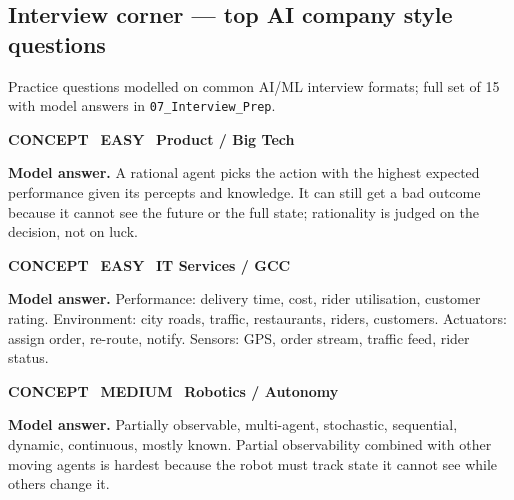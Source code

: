 \subsection*{Interview corner --- top AI company style questions}
{\small\color{slate}Practice questions modelled on common AI/ML interview formats; full set of 15 with model answers in \texttt{07\_Interview\_Prep}.}
\begin{tcolorbox}[enhanced,breakable,colback=white,colframe=teal,arc=2mm,boxrule=0.8pt,left=3mm,right=3mm,
 title={\textbf{QI.01}\quad What is a rational agent, and why is rational not the same as perfect?},fonttitle=\color{white}\small,colbacktitle=teal]
\colorbox{teal!15}{\scriptsize\bfseries\color{teal} CONCEPT}\
\colorbox{leaf!15}{\scriptsize\bfseries\color{leaf} EASY}\
\colorbox{navy!8}{\scriptsize\bfseries\color{navy} Product / Big Tech}\par\smallskip
\textbf{\color{navy}Model answer.} A rational agent picks the action with the highest expected performance given its percepts and knowledge. It can still get a bad outcome because it cannot see the future or the full state; rationality is judged on the decision, not on luck.
\end{tcolorbox}
\begin{tcolorbox}[enhanced,breakable,colback=white,colframe=teal,arc=2mm,boxrule=0.8pt,left=3mm,right=3mm,
 title={\textbf{QI.02}\quad Write the PEAS description for a food-delivery app's rider-assignment agent.},fonttitle=\color{white}\small,colbacktitle=teal]
\colorbox{teal!15}{\scriptsize\bfseries\color{teal} CONCEPT}\
\colorbox{leaf!15}{\scriptsize\bfseries\color{leaf} EASY}\
\colorbox{navy!8}{\scriptsize\bfseries\color{navy} IT Services / GCC}\par\smallskip
\textbf{\color{navy}Model answer.} Performance: delivery time, cost, rider utilisation, customer rating. Environment: city roads, traffic, restaurants, riders, customers. Actuators: assign order, re-route, notify. Sensors: GPS, order stream, traffic feed, rider status.
\end{tcolorbox}
\begin{tcolorbox}[enhanced,breakable,colback=white,colframe=teal,arc=2mm,boxrule=0.8pt,left=3mm,right=3mm,
 title={\textbf{QI.03}\quad Classify a warehouse robot's environment along the seven properties and say which property makes it hardest.},fonttitle=\color{white}\small,colbacktitle=teal]
\colorbox{teal!15}{\scriptsize\bfseries\color{teal} CONCEPT}\
\colorbox{gold!85!black!15}{\scriptsize\bfseries\color{gold!85!black} MEDIUM}\
\colorbox{navy!8}{\scriptsize\bfseries\color{navy} Robotics / Autonomy}\par\smallskip
\textbf{\color{navy}Model answer.} Partially observable, multi-agent, stochastic, sequential, dynamic, continuous, mostly known. Partial observability combined with other moving agents is hardest because the robot must track state it cannot see while others change it.
\end{tcolorbox}
